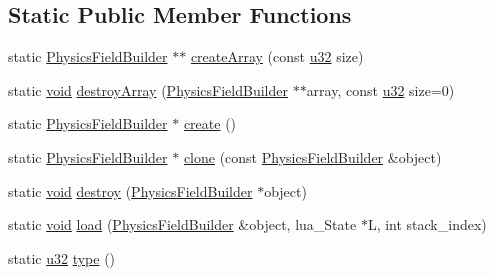 \subsection*{Static Public Member Functions}
\begin{DoxyCompactItemize}
\item 
static \mbox{\hyperlink{classnjli_1_1_physics_field_builder}{Physics\+Field\+Builder}} $\ast$$\ast$ \mbox{\hyperlink{classnjli_1_1_physics_field_builder_aa1e7294df124723f5eaf563c58430d2d}{create\+Array}} (const \mbox{\hyperlink{_util_8h_a10e94b422ef0c20dcdec20d31a1f5049}{u32}} size)
\item 
static \mbox{\hyperlink{_thread_8h_af1e856da2e658414cb2456cb6f7ebc66}{void}} \mbox{\hyperlink{classnjli_1_1_physics_field_builder_a706cc8a4651003410842cc201731cf1f}{destroy\+Array}} (\mbox{\hyperlink{classnjli_1_1_physics_field_builder}{Physics\+Field\+Builder}} $\ast$$\ast$array, const \mbox{\hyperlink{_util_8h_a10e94b422ef0c20dcdec20d31a1f5049}{u32}} size=0)
\item 
static \mbox{\hyperlink{classnjli_1_1_physics_field_builder}{Physics\+Field\+Builder}} $\ast$ \mbox{\hyperlink{classnjli_1_1_physics_field_builder_ac4194a649769d0cd234e9174ccd56257}{create}} ()
\item 
static \mbox{\hyperlink{classnjli_1_1_physics_field_builder}{Physics\+Field\+Builder}} $\ast$ \mbox{\hyperlink{classnjli_1_1_physics_field_builder_ae22483c5cbbe46de578d2ea76184419b}{clone}} (const \mbox{\hyperlink{classnjli_1_1_physics_field_builder}{Physics\+Field\+Builder}} \&object)
\item 
static \mbox{\hyperlink{_thread_8h_af1e856da2e658414cb2456cb6f7ebc66}{void}} \mbox{\hyperlink{classnjli_1_1_physics_field_builder_a533642614f2f7ce25456722a0ecf7fac}{destroy}} (\mbox{\hyperlink{classnjli_1_1_physics_field_builder}{Physics\+Field\+Builder}} $\ast$object)
\item 
static \mbox{\hyperlink{_thread_8h_af1e856da2e658414cb2456cb6f7ebc66}{void}} \mbox{\hyperlink{classnjli_1_1_physics_field_builder_a528569317d69d7470cd2129ace16a330}{load}} (\mbox{\hyperlink{classnjli_1_1_physics_field_builder}{Physics\+Field\+Builder}} \&object, lua\+\_\+\+State $\ast$L, int stack\+\_\+index)
\item 
static \mbox{\hyperlink{_util_8h_a10e94b422ef0c20dcdec20d31a1f5049}{u32}} \mbox{\hyperlink{classnjli_1_1_physics_field_builder_a3f8f63a0e33bd854d2277ace452804cd}{type}} ()
\end{DoxyCompactItemize}
